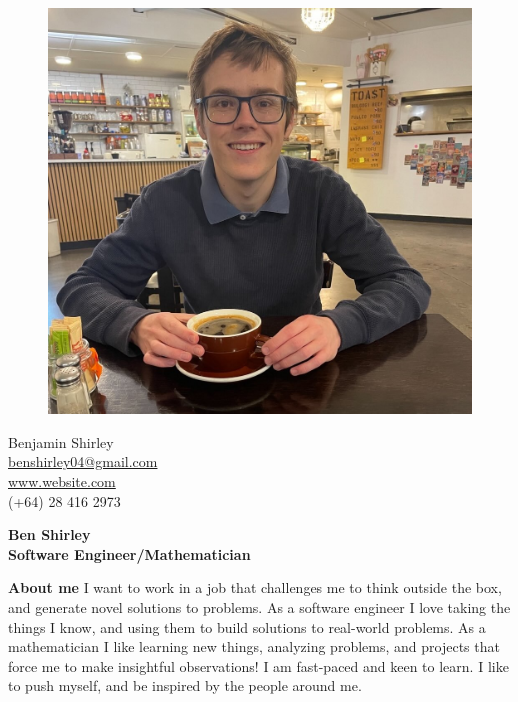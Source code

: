 \documentclass[a4paper,12pt,final]{memoir}
\newcommand{\Sep}{\vspace{1.5em}}
\newenvironment{AboutMe}
	{\ignorespaces\textbf{\color{RoyalBlue} About me}}
	{\Sep\ignorespacesafterend}
\begin{document}
%
\begin{figure}
	\hfill
	\includegraphics[width=\columnwidth]{./static/public/resources/profile_pic.jpeg}
	\vspace{-7cm}
\end{figure}

\begin{flushright}\small
	Benjamin Shirley \\
	\url{benshirley04@gmail.com}  \\
	\url{www.website.com} \\
	(+64) 28 416 2973
\end{flushright}\normalsize
\framebreak


\Huge\bfseries {\color{RoyalBlue} Ben Shirley} \\
\Large\bfseries  Software Engineer/Mathematician \\

\normalsize\normalfont

\begin{AboutMe}
	I want to work in a job that challenges me to think outside the box, and generate novel solutions to problems.
	As a software engineer I love taking the things I know, and using them to build solutions to real-world problems. As a mathematician I like 
	learning new things, analyzing problems, and projects that force me to make insightful observations! I am fast-paced and keen to learn. I like to push
	myself, and be inspired by the people around me.
\end{AboutMe}
\end{document}
